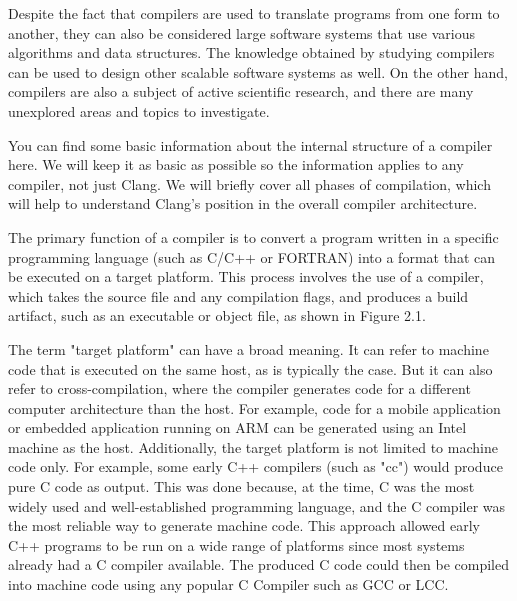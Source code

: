 Despite the fact that compilers are used to translate programs from one form to another, they can also be considered large software systems that use various algorithms and data structures. The knowledge obtained by studying compilers can be used to design other scalable software systems as well. On the other hand, compilers are also a subject of active scientific research, and there are many unexplored areas and topics to investigate.

You can find some basic information about the internal structure of a compiler here. We will keep it as basic as possible so the information applies to any compiler, not just Clang. We will briefly cover all phases of compilation, which will help to understand Clang's position in the overall compiler architecture.


The primary function of a compiler is to convert a program written in a specific programming language (such as C/C++ or FORTRAN) into a format that can be executed on a target platform. This process involves the use of a compiler, which takes the source file and any compilation flags, and produces a build artifact, such as an executable or object file, as shown in Figure 2.1.


The term "target platform" can have a broad meaning. It can refer to machine code that is executed on the same host, as is typically the case. But it can also refer to cross-compilation, where the compiler generates code for a different computer architecture than the host. For example, code for a mobile application or embedded application running on ARM can be generated using an Intel machine as the host. Additionally, the target platform is not limited to machine code only. For example, some early C++ compilers (such as "cc") would produce pure C code as output. This was done because, at the time, C was the most widely used and well-established programming language, and the C compiler was the most reliable way to generate machine code. This approach allowed early C++ programs to be run on a wide range of platforms since most systems already had a C compiler available. The produced C code could then be compiled into machine code using any popular C Compiler such as GCC or LCC.


